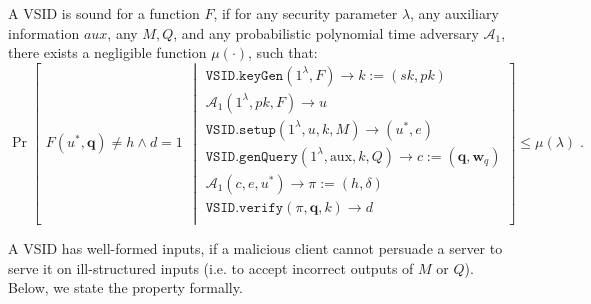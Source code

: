 \begin{definition}\label{deff::VSID-Soundness}  A VSID  is sound for a function $F$, if for any security parameter $\lambda$, any auxiliary information $aux$, any $M,Q$, and any probabilistic polynomial time adversary $\mathcal{A}_{\scriptscriptstyle 1}$, there exists a negligible function $\mu(\cdot)$, such that: 
\small{
$$ \Pr\left[
  \begin{array}{l}
F(u^{\scriptscriptstyle *}, \bm{q})\neq h \wedge d=1
\end{array} \middle |
    \begin{array}{l}
    \mathtt{VSID.keyGen}(1^{\lambda},F)\rightarrow k:=(sk,pk)\\
    \mathcal{A}_{\scriptscriptstyle 1}(1^{\scriptscriptstyle\lambda},pk, F)\rightarrow u\\
    \mathtt{VSID.setup}(1^{\lambda}, u, k, M)\rightarrow (u^{\scriptscriptstyle *},e)\\
    \mathtt{VSID.genQuery}(1^{\lambda},  \text{aux},k,Q)\rightarrow c:=(\bm{q}, \bm{w}_{q})\\
     \mathcal{A}_{\scriptscriptstyle 1}(c,e, u^{\scriptscriptstyle *})\rightarrow \pi:=(h,\delta)\\
     \mathtt{VSID.verify}(\pi,\bm{q},k)\rightarrow d\\
\end{array}    \right]\leq \mu(\lambda)\;.$$
}
\end{definition}


A VSID has   well-formed inputs, if a malicious client cannot persuade a server to serve it on  ill-structured inputs (i.e. to accept  incorrect outputs of $M$ or $Q$). Below, we state the property formally.

